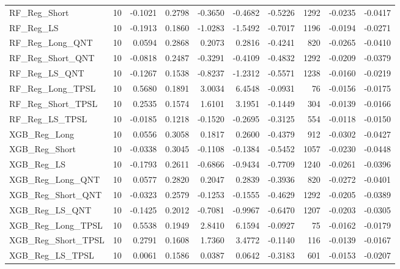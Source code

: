 \begin{tabular}{llrrrrrrrr}
\cline{1-10}
RF\_Reg\_Short & 10 & -0.1021 & 0.2798 & -0.3650 & -0.4682 & -0.5226 & 1292 & -0.0235 & -0.0417 \\
\cline{1-10}
RF\_Reg\_LS & 10 & -0.1913 & 0.1860 & -1.0283 & -1.5492 & -0.7017 & 1196 & -0.0194 & -0.0271 \\
\cline{1-10}
RF\_Reg\_Long\_QNT & 10 & 0.0594 & 0.2868 & 0.2073 & 0.2816 & -0.4241 & 820 & -0.0265 & -0.0410 \\
\cline{1-10}
RF\_Reg\_Short\_QNT & 10 & -0.0818 & 0.2487 & -0.3291 & -0.4109 & -0.4832 & 1292 & -0.0209 & -0.0379 \\
\cline{1-10}
RF\_Reg\_LS\_QNT & 10 & -0.1267 & 0.1538 & -0.8237 & -1.2312 & -0.5571 & 1238 & -0.0160 & -0.0219 \\
\cline{1-10}
RF\_Reg\_Long\_TPSL & 10 & 0.5680 & 0.1891 & 3.0034 & 6.4548 & -0.0931 & 76 & -0.0156 & -0.0175 \\
\cline{1-10}
RF\_Reg\_Short\_TPSL & 10 & 0.2535 & 0.1574 & 1.6101 & 3.1951 & -0.1449 & 304 & -0.0139 & -0.0166 \\
\cline{1-10}
RF\_Reg\_LS\_TPSL & 10 & -0.0185 & 0.1218 & -0.1520 & -0.2695 & -0.3125 & 554 & -0.0118 & -0.0150 \\
\cline{1-10}
XGB\_Reg\_Long & 10 & 0.0556 & 0.3058 & 0.1817 & 0.2600 & -0.4379 & 912 & -0.0302 & -0.0427 \\
\cline{1-10}
XGB\_Reg\_Short & 10 & -0.0338 & 0.3045 & -0.1108 & -0.1384 & -0.5452 & 1057 & -0.0230 & -0.0448 \\
\cline{1-10}
XGB\_Reg\_LS & 10 & -0.1793 & 0.2611 & -0.6866 & -0.9434 & -0.7709 & 1240 & -0.0261 & -0.0396 \\
\cline{1-10}
XGB\_Reg\_Long\_QNT & 10 & 0.0577 & 0.2820 & 0.2047 & 0.2839 & -0.3936 & 820 & -0.0272 & -0.0401 \\
\cline{1-10}
XGB\_Reg\_Short\_QNT & 10 & -0.0323 & 0.2579 & -0.1253 & -0.1555 & -0.4629 & 1292 & -0.0205 & -0.0389 \\
\cline{1-10}
XGB\_Reg\_LS\_QNT & 10 & -0.1425 & 0.2012 & -0.7081 & -0.9967 & -0.6470 & 1207 & -0.0203 & -0.0305 \\
\cline{1-10}
XGB\_Reg\_Long\_TPSL & 10 & 0.5538 & 0.1949 & 2.8410 & 6.1594 & -0.0927 & 75 & -0.0162 & -0.0179 \\
\cline{1-10}
XGB\_Reg\_Short\_TPSL & 10 & 0.2791 & 0.1608 & 1.7360 & 3.4772 & -0.1140 & 116 & -0.0139 & -0.0167 \\
\cline{1-10}
XGB\_Reg\_LS\_TPSL & 10 & 0.0061 & 0.1586 & 0.0387 & 0.0642 & -0.3183 & 601 & -0.0153 & -0.0207 \\

\end{tabular}
